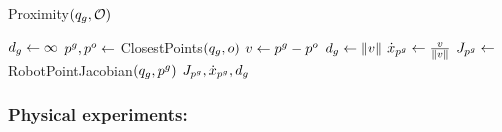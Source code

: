 \begin{algorithm}[h]
\caption{Proximity$(q_g, \mathcal{O})$}
\label{alg:proximity}
\begin{algorithmic}[1]
    \State $d_g \gets \infty$
        \State $p^g, p^o \gets$ ClosestPoints$(q_g, o)$
        \State $v \gets p^g - p^o$
            \State $d_g \gets \| v \|$
            \State $\dot x_{p^g} \gets \frac{v}{\| v \|}$
            \State $J_{p^g} \gets$ RobotPointJacobian$(q_g, p^g)$
        \EndIf
    \EndFor
    \State \Return $J_{p^g}, \dot x_{p^g}, d_g$
\end{algorithmic}
\end{algorithm}

\FloatBarrier

\subsubsection{Physical experiments:}
\label{sec:stretching_avoidance_controller_physical_robot_implementation}

